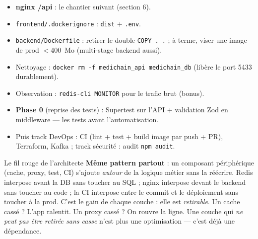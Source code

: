 \documentclass[11pt,a4paper]{article}
\begin{document}
\begin{itemize}[nosep]
  \item \textbf{nginx /api} : le chantier suivant (section 6).
  \item \texttt{frontend/.dockerignore} : \texttt{dist} $+$ \texttt{.env}.
  \item \texttt{backend/Dockerfile} : retirer le double \texttt{COPY . .} ;
        à terme, viser une image de prod $<$400~Mo (multi-stage backend aussi).
  \item Nettoyage : \texttt{docker rm -f medichain\_api medichain\_db}
        (libère le port 5433 durablement).
  \item Observation : \texttt{redis-cli MONITOR} pour le trafic brut (bonus).
  \item \textbf{Phase 0} (reprise des tests) : Supertest sur l'API + validation Zod
        en middleware --- les tests avant l'automatisation.
  \item Puis track DevOps : CI (lint + test + build image par push + PR),
        Terraform, Kafka ; track sécurité : audit \texttt{npm audit}.
\end{itemize}

\begin{nextbox}{Le fil rouge de l'architecte}
\textbf{Même pattern partout} : un composant périphérique (cache, proxy,
test, CI) s'ajoute \emph{autour} de la logique métier sans la réécrire.
Redis interpose avant la DB sans toucher au SQL ; nginx interpose devant le
backend sans toucher au code ; la CI interpose entre le commit et le déploiement
sans toucher à la prod. C'est le gain de chaque couche : elle est
\emph{retirable}. Un cache cassé ? L'app ralentit. Un proxy cassé ? On
rouvre la ligne. Une couche qui \emph{ne peut pas être retirée sans casse}
n'est plus une optimisation --- c'est déjà une dépendance.
\end{nextbox}
\end{document}
